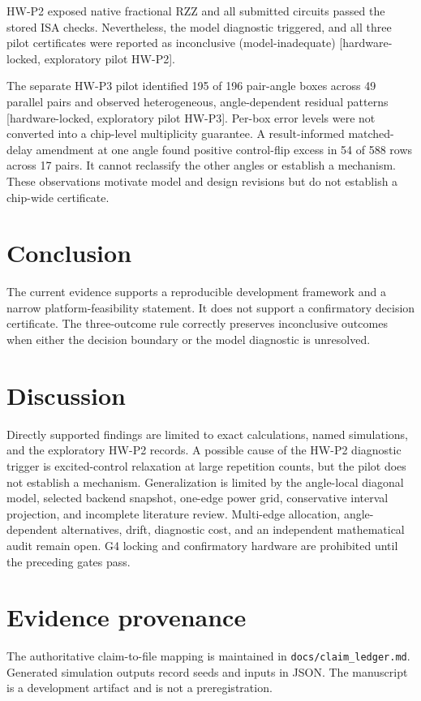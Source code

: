 \documentclass[10pt,twocolumn]{article}
\newcommand{\RZZ}{\mathrm{RZZ}}
\newcommand{\evidence}[1]{\textnormal{[#1]}}
\begin{document}
HW-P2 exposed native fractional $\RZZ$ and all submitted circuits passed the
stored ISA checks.  Nevertheless, the model diagnostic triggered, and all
three pilot certificates were reported as inconclusive (model-inadequate)
\evidence{hardware-locked, exploratory pilot HW-P2}.

The separate HW-P3 pilot identified 195 of 196 pair-angle boxes across 49
parallel pairs and observed heterogeneous, angle-dependent residual patterns
\evidence{hardware-locked, exploratory pilot HW-P3}.  Per-box error levels
were not converted into a chip-level multiplicity guarantee.  A
result-informed matched-delay amendment at one angle found positive
control-flip excess in 54 of 588 rows across 17 pairs.  It cannot reclassify
the other angles or establish a mechanism.  These observations motivate model
and design revisions but do not establish a chip-wide certificate.

\section{Conclusion}
The current evidence supports a reproducible development framework and a
narrow platform-feasibility statement.  It does not support a confirmatory
decision certificate.  The three-outcome rule correctly preserves
inconclusive outcomes when either the decision boundary or the model
diagnostic is unresolved.

\section{Discussion}
Directly supported findings are limited to exact calculations, named
simulations, and the exploratory HW-P2 records.  A possible cause of the HW-P2
diagnostic trigger is excited-control relaxation at large repetition counts,
but the pilot does not establish a mechanism.  Generalization is limited by
the angle-local diagonal model, selected backend snapshot, one-edge power
grid, conservative interval projection, and incomplete literature review.
Multi-edge allocation, angle-dependent alternatives, drift, diagnostic cost,
and an independent mathematical audit remain open.  G4 locking and
confirmatory hardware are prohibited until the preceding gates pass.




\appendix
\section{Evidence provenance}
The authoritative claim-to-file mapping is maintained in
\texttt{docs/claim\_ledger.md}.  Generated simulation outputs record seeds and
inputs in JSON.  The manuscript is a development artifact and is not a
preregistration.
\end{document}
